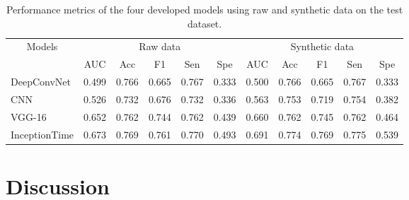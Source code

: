 \documentclass{article}
\begin{document}
\begin{table}[]
\centering
\caption{Performance metrics of the four developed models using raw and synthetic data on the test dataset.}
\begin{tabular}{|l|c|c|c|c|c|c|c|c|c|c|} 
\hline
\multicolumn{1}{|c|}{\multirow{2}{*}{Models}} & \multicolumn{5}{c|}{Raw data} & \multicolumn{5}{c|}{Synthetic data} \\ \cline{2-11} 
\multicolumn{1}{|c|}{}                        & AUC  & Acc  & F1 & Sen & Spe & AUC   & Acc   & F1   & Sen  & Spe  \\ \hline
DeepConvNet                                          &0.499      &0.766       &0.665    &0.767     &0.333     &0.500       &0.766        &0.665      &0.767      &0.333      \\ \hline
CNN                                &      0.526&       0.732&    0.676&     0.732&     0.336&       0.563&        0.753&      0.719&      0.754& 0.382      \\ \hline
VGG-16                                        & 0.652      &0.762       &0.744    &0.762     &0.439     &0.660       &0.762        &0.745      &0.762      &0.464      \\ \hline
InceptionTime                                   & 0.673      &0.769       &0.761    &0.770     &0.493     &0.691       &0.774        &0.769      &0.775      &0.539 \\ \hline
\end{tabular}
\end{table}

\section{Discussion}

\end{document}
